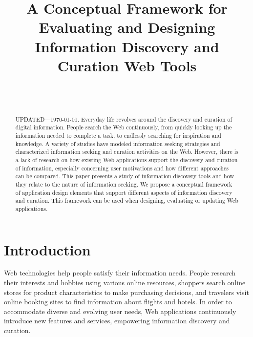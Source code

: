 \documentclass{sigchi}
\begin{document}
\title{A Conceptual Framework for Evaluating and Designing Information Discovery and Curation Web Tools}

\author{%
  \\
  \\
}

\maketitle

\begin{abstract}
  UPDATED---\today. Everyday life revolves around the discovery and curation of digital information. People search the Web continuously, from quickly looking up the information needed to complete a task, to endlessly searching for inspiration and knowledge. A variety of studies have modeled information seeking strategies and characterized information seeking and curation activities on the Web. However, there is a lack of research on how existing Web applications support the discovery and curation of information, especially concerning user motivations and how different approaches can be compared. This paper presents a study of information discovery tools and how they relate to the nature of information seeking. We propose a conceptual framework of application design elements that support different aspects of information discovery and curation. This framework can be used when designing, evaluating or updating Web applications.
\end{abstract}


 

\section{Introduction}
\label{section:introduction}
Web technologies help people satisfy their information needs. People research their interests and hobbies using various online resources, shoppers search online stores for product characteristics to make purchasing decisions, and travelers visit online booking sites to find information about flights and hotels. In order to accommodate diverse and evolving user needs, Web applications continuously introduce new features and services, empowering information discovery and curation. 
\end{document}
